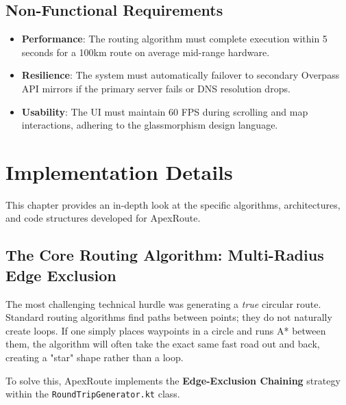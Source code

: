 \documentclass[12pt,a4paper,oneside]{report}
\begin{document}
\section{Non-Functional Requirements}
\begin{itemize}
    \item \textbf{Performance}: The routing algorithm must complete execution within 5 seconds for a 100km route on average mid-range hardware.
    \item \textbf{Resilience}: The system must automatically failover to secondary Overpass API mirrors if the primary server fails or DNS resolution drops.
    \item \textbf{Usability}: The UI must maintain 60 FPS during scrolling and map interactions, adhering to the glassmorphism design language.
\end{itemize}

\chapter{Implementation Details}

This chapter provides an in-depth look at the specific algorithms, architectures, and code structures developed for ApexRoute.

\section{The Core Routing Algorithm: Multi-Radius Edge Exclusion}
The most challenging technical hurdle was generating a \textit{true} circular route. Standard routing algorithms find paths between points; they do not naturally create loops. If one simply places waypoints in a circle and runs A* between them, the algorithm will often take the exact same fast road out and back, creating a "star" shape rather than a loop.

To solve this, ApexRoute implements the \textbf{Edge-Exclusion Chaining} strategy within the \texttt{RoundTripGenerator.kt} class.
\end{document}
